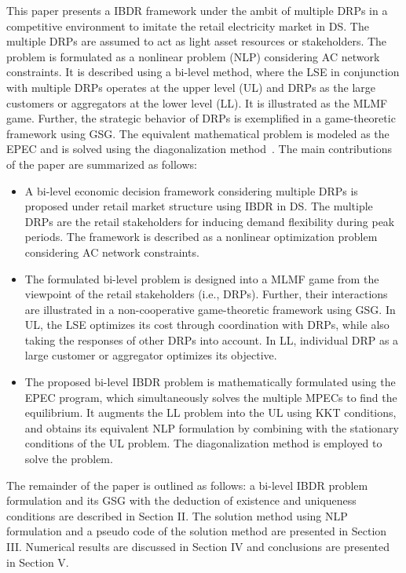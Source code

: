 \documentclass[journal]{IEEEtran}
\begin{document}
This paper presents a IBDR framework under the ambit of multiple DRPs in a competitive environment to imitate the retail electricity market in DS. The multiple DRPs are assumed to act as light asset resources or stakeholders. The problem is formulated as a nonlinear problem (NLP) considering AC network constraints. It is described using a bi-level method, where the LSE in conjunction with multiple DRPs operates at the upper level (UL) and DRPs as the large customers or aggregators at the lower level (LL). It is illustrated as the MLMF game. Further, the strategic behavior of DRPs is exemplified in a game-theoretic framework using GSG. The equivalent mathematical problem is modeled as the EPEC and is solved using the diagonalization method~\cite{su2004sequential,leyffer2010solving}. 
The main contributions of the paper are summarized as follows:
\begin{itemize}
	\item A bi-level economic decision framework considering multiple DRPs is proposed under retail market structure using IBDR in DS. The multiple DRPs are the retail stakeholders for inducing demand flexibility during peak periods. The framework is described as a nonlinear optimization problem considering AC network constraints.
	\item The formulated bi-level problem is designed into a MLMF game from the viewpoint of the retail stakeholders (i.e., DRPs). Further, their interactions are illustrated in a  non-cooperative game-theoretic framework using GSG. In UL, the LSE optimizes its cost through coordination with DRPs, while also taking the responses of other DRPs into account. In LL, individual DRP as a large customer or aggregator optimizes its objective.  
	\item The proposed bi-level IBDR problem is mathematically formulated using the EPEC program, which simultaneously solves the multiple MPECs to find the equilibrium. It augments the LL problem into the UL using KKT conditions, and obtains its equivalent NLP formulation by combining with the stationary conditions of the UL problem. The diagonalization method is employed to solve the problem.
\end{itemize}

The remainder of the paper is outlined as follows: a bi-level IBDR problem formulation and its GSG with the deduction of existence and uniqueness  conditions are described in Section II. The solution method using NLP formulation and a pseudo code of the solution method are presented in Section III. Numerical results are discussed in Section IV and conclusions are presented in Section V.
\end{document}
